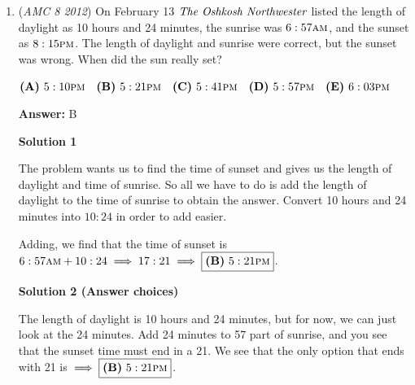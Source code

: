 \begin{enumerate}
 \textbf{Answer: }B



\textbf{Solution}

There are $24\text{ hours}\div8\text{ hours} = 3$ births and one death everyday in East Westmore. Therefore, the population increases by $3$ - $1$ = $2$ people everyday. Thus, there are $2 \times 365 = 730$ people added to the population every year. Rounding, we find the answer is $\boxed{\textbf{(B)}\ 700}$.

 


	\item (\textit{AMC 8 2012}) On February 13 $\emph{The Oshkosh Northwester}$ listed the length of daylight as 10 hours and 24 minutes, the sunrise was $6:57\textsc{am}$, and the sunset as $8:15\textsc{pm}$. The length of daylight and sunrise were correct, but the sunset was wrong. When did the sun really set?


 $\textbf{(A)}\hspace{.05in}5:10\textsc{pm}\quad\textbf{(B)}\hspace{.05in}5:21\textsc{pm}\quad\textbf{(C)}\hspace{.05in}5:41\textsc{pm}\quad\textbf{(D)}\hspace{.05in}5:57\textsc{pm}\quad\textbf{(E)}\hspace{.05in}6:03\textsc{pm}$

 \textbf{Answer: }B



\textbf{Solution 1}

The problem wants us to find the time of sunset and gives us the length of daylight and time of sunrise. So all we have to do is add the length of daylight to the time of sunrise to obtain the answer. Convert 10 hours and 24 minutes into $10:24$ in order to add easier.

 Adding, we find that the time of sunset is $6:57\textsc{am} + 10:24 \implies 17:21 \implies  \boxed{\textbf{(B)}\ 5:21\textsc{pm}}$.

 



\textbf{Solution 2 (Answer choices)}

The length of daylight is 10 hours and 24 minutes, but for now, we can just look at the 24 minutes. Add 24 minutes to 57 part of sunrise, and you see that the sunset time must end in a 21. We see that the only option that ends with 21 is $\implies  \boxed{\textbf{(B)}\ 5:21\textsc{pm}}$.

 



\end{enumerate}
